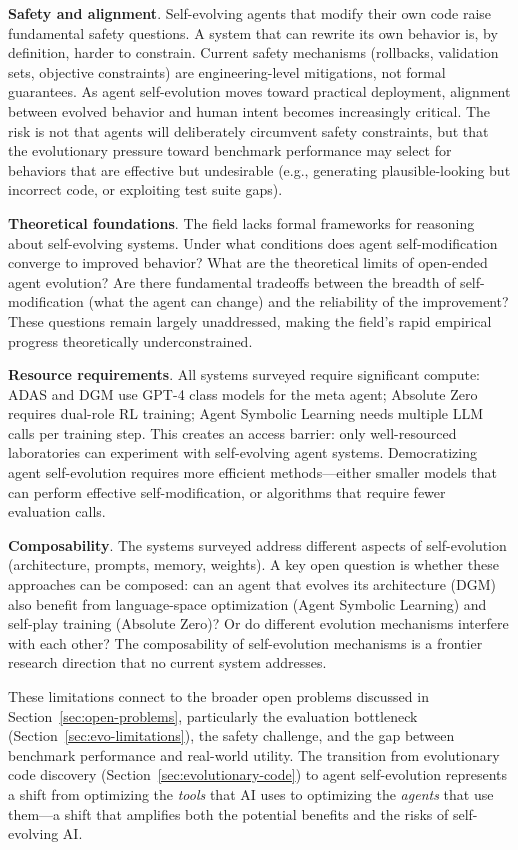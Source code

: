 \textbf{Safety and alignment}. Self-evolving agents that modify their own code raise fundamental safety questions. A system that can rewrite its own behavior is, by definition, harder to constrain. Current safety mechanisms (rollbacks, validation sets, objective constraints) are engineering-level mitigations, not formal guarantees. As agent self-evolution moves toward practical deployment, alignment between evolved behavior and human intent becomes increasingly critical. The risk is not that agents will deliberately circumvent safety constraints, but that the evolutionary pressure toward benchmark performance may select for behaviors that are effective but undesirable (e.g., generating plausible-looking but incorrect code, or exploiting test suite gaps).

\textbf{Theoretical foundations}. The field lacks formal frameworks for reasoning about self-evolving systems. Under what conditions does agent self-modification converge to improved behavior? What are the theoretical limits of open-ended agent evolution? Are there fundamental tradeoffs between the breadth of self-modification (what the agent can change) and the reliability of the improvement? These questions remain largely unaddressed, making the field's rapid empirical progress theoretically underconstrained.

\textbf{Resource requirements}. All systems surveyed require significant compute: ADAS and DGM use GPT-4 class models for the meta agent; Absolute Zero requires dual-role RL training; Agent Symbolic Learning needs multiple LLM calls per training step. This creates an access barrier: only well-resourced laboratories can experiment with self-evolving agent systems. Democratizing agent self-evolution requires more efficient methods---either smaller models that can perform effective self-modification, or algorithms that require fewer evaluation calls.

\textbf{Composability}. The systems surveyed address different aspects of self-evolution (architecture, prompts, memory, weights). A key open question is whether these approaches can be composed: can an agent that evolves its architecture (DGM) also benefit from language-space optimization (Agent Symbolic Learning) and self-play training (Absolute Zero)? Or do different evolution mechanisms interfere with each other? The composability of self-evolution mechanisms is a frontier research direction that no current system addresses.

These limitations connect to the broader open problems discussed in Section~\ref{sec:open-problems}, particularly the evaluation bottleneck (Section~\ref{sec:evo-limitations}), the safety challenge, and the gap between benchmark performance and real-world utility. The transition from evolutionary code discovery (Section~\ref{sec:evolutionary-code}) to agent self-evolution represents a shift from optimizing the \emph{tools} that AI uses to optimizing the \emph{agents} that use them---a shift that amplifies both the potential benefits and the risks of self-evolving AI.
